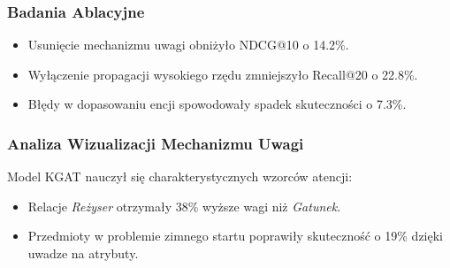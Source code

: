 \documentclass[a4paper,onecolumn]{LTJournalArticle}
\begin{document}
\subsubsection{Badania Ablacyjne}
\begin{itemize}
    \item Usunięcie mechanizmu uwagi obniżyło NDCG@10 o 14.2\%.
    \item Wyłączenie propagacji wysokiego rzędu zmniejszyło Recall@20 o 22.8\%.
    \item Błędy w dopasowaniu encji spowodowały spadek skuteczności o 7.3\%.
\end{itemize}

\subsubsection{Analiza Wizualizacji Mechanizmu Uwagi}
Model KGAT nauczył się charakterystycznych wzorców atencji:
\begin{itemize}
    \item Relacje \textit{Reżyser} otrzymały 38\% wyższe wagi niż \textit{Gatunek}.
    \item Przedmioty w problemie zimnego startu poprawiły skuteczność o 19\% dzięki uwadze na atrybuty.
\end{itemize}
	


	
	\printbibliography %
	
	
\end{document}
